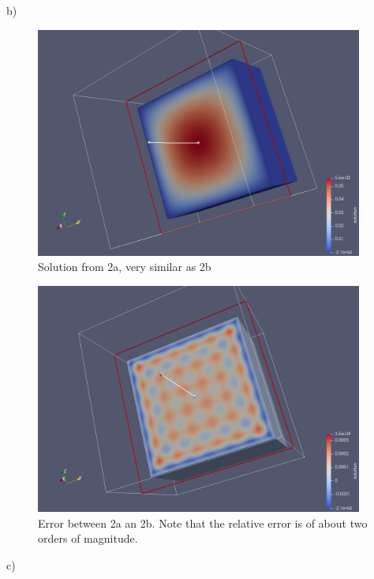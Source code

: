 b)

\begin{figure}[h]
	\includegraphics[width=0.96\textwidth]{heatb.png} 
	\caption{Solution from 2a, very similar as 2b}
\end{figure}


\begin{figure}[h]
	\includegraphics[width=0.96\textwidth]{error2b.png} 
	\caption{Error between 2a an 2b. Note that the relative error is of about two orders of magnitude.}
\end{figure}

c)

